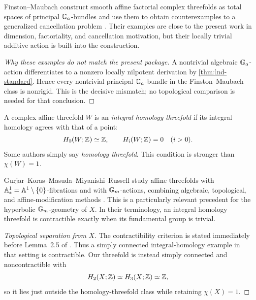 \begin{historicalnote}\label{hist:finston-maubach}
Finston--Maubach construct smooth affine factorial complex threefolds as total spaces of principal $\mathbb G_a$-bundles and use them to obtain counterexamples to a generalized cancellation problem \cite{FinstonMaubach2008}.  Their examples are close to the present work in dimension, factoriality, and cancellation motivation, but their locally trivial additive action is built into the construction.
\end{historicalnote}

\begin{proof}[Why these examples do not match the present package]
A nontrivial algebraic $\mathbb G_a$-action differentiates to a nonzero locally nilpotent derivation by \cref{thm:lnd-standard}.  Hence every nontrivial principal $\mathbb G_a$-bundle in the Finston--Maubach class is nonrigid.  This is the decisive mismatch; no topological comparison is needed for that conclusion.
\end{proof}

\begin{definition}\label{def:integral-homology-threefold}
A complex affine threefold $W$ is an \emph{integral homology threefold} if its integral homology agrees with that of a point:
\[
  H_0(W;\mathbb Z)\simeq\mathbb Z,
  \qquad
  H_i(W;\mathbb Z)=0\quad(i>0).
\]
Some authors simply say \emph{homology threefold}.  This condition is stronger than $\chi(W)=1$.
\end{definition}

\begin{historicalnote}\label{hist:a1star-threefolds}
Gurjar--Koras--Masuda--Miyanishi--Russell study affine threefolds with $\mathbb A^1_*=\mathbb A^1\setminus\{0\}$-fibrations and with $\mathbb G_m$-actions, combining algebraic, topological, and affine-modification methods \cite{GurjarKorasMasudaMiyanishiRussell2013}.  This is a particularly relevant precedent for the hyperbolic $\mathbb G_m$-geometry of $X$.  In their terminology, an integral homology threefold is contractible exactly when its fundamental group is trivial.
\end{historicalnote}

\begin{proof}[Topological separation from $X$]
The contractibility criterion is stated immediately before Lemma~2.5 of \cite{GurjarKorasMasudaMiyanishiRussell2013}.  Thus a simply connected integral-homology example in that setting is contractible.  Our threefold is instead simply connected and noncontractible with
\[
  H_2(X;\mathbb Z)\simeq H_3(X;\mathbb Z)\simeq\mathbb Z,
\]
so it lies just outside the homology-threefold class while retaining $\chi(X)=1$.
\end{proof}

